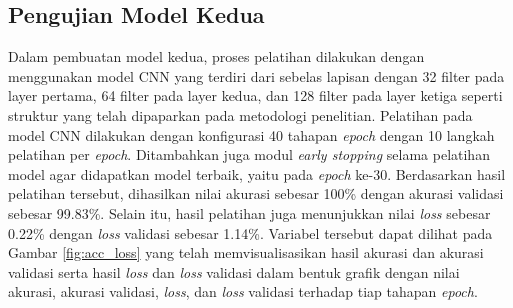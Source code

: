 \subsection{Pengujian Model Kedua}

Dalam pembuatan model kedua, proses pelatihan dilakukan dengan menggunakan model CNN yang terdiri dari sebelas lapisan dengan 32 filter pada layer pertama, 64 filter pada layer kedua, dan 128 filter pada layer ketiga seperti struktur yang telah dipaparkan pada metodologi penelitian. Pelatihan pada model CNN dilakukan dengan konfigurasi 40 tahapan \emph{epoch} dengan 10 langkah pelatihan per \emph{epoch}. Ditambahkan juga modul \emph{early stopping} selama pelatihan model agar didapatkan model terbaik, yaitu pada \emph{epoch} ke-30. Berdasarkan hasil pelatihan tersebut, dihasilkan nilai akurasi sebesar 100\% dengan akurasi validasi sebesar 99.83\%. Selain itu, hasil pelatihan juga menunjukkan nilai \emph{loss} sebesar 0.22\% dengan \emph{loss} validasi sebesar 1.14\%. Variabel tersebut dapat dilihat pada Gambar \ref{fig:acc_loss} yang telah memvisualisasikan hasil akurasi dan akurasi validasi serta hasil \emph{loss} dan \emph{loss} validasi dalam bentuk grafik dengan nilai akurasi, akurasi validasi, \emph{loss}, dan \emph{loss} validasi terhadap tiap tahapan \emph{epoch}.

